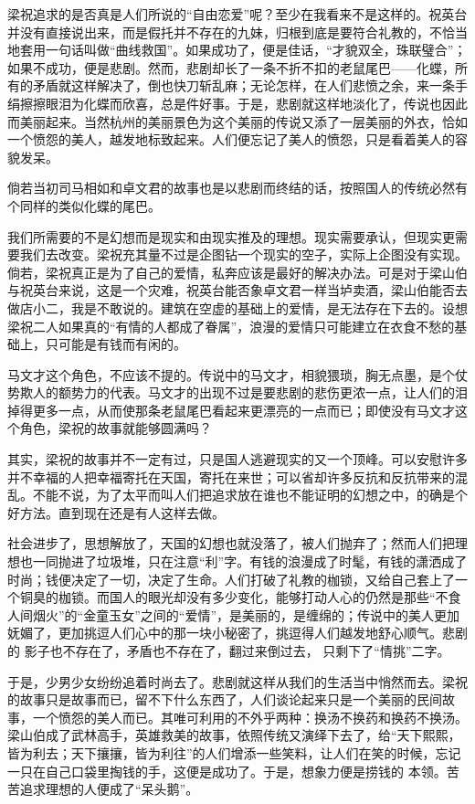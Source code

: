 梁祝追求的是否真是人们所说的“自由恋爱”呢？至少在我看来不是这样的。祝英台并没有直接说出来，而是假托并不存在的九妹，归根到底是要符合礼教的，不恰当地套用一句话叫做“曲线救国”。如果成功了，便是佳话，“才貌双全，珠联璧合”；如果不成功，便是悲剧。然而，悲剧却长了一条不折不扣的老鼠尾巴——化蝶，所有的矛盾就这样解决了，倒也快刀斩乱麻；无论怎样，在人们悲愤之余，来一条手绢擦擦眼泪为化蝶而欣喜，总是件好事。于是，悲剧就这样地淡化了，传说也因此而美丽起来。当然杭州的美丽景色为这个美丽的传说又添了一层美丽的外衣，恰如一个愤怨的美人，越发地标致起来。人们便忘记了美人的愤怨，只是看着美人的容貌发呆。

倘若当初司马相如和卓文君的故事也是以悲剧而终结的话，按照国人的传统必然有个同样的类似化蝶的尾巴。

我们所需要的不是幻想而是现实和由现实推及的理想。现实需要承认，但现实更需要我们去改变。梁祝充其量不过是企图钻一个现实的空子，实际上企图没有实现。倘若，梁祝真正是为了自己的爱情，私奔应该是最好的解决办法。可是对于梁山伯与祝英台来说，这是一个灾难，祝英台能否象卓文君一样当垆卖酒，梁山伯能否去做店小二，我是不敢说的。建筑在空虚的基础上的爱情，是无法存在下去的。设想梁祝二人如果真的“有情的人都成了眷属”，浪漫的爱情只可能建立在衣食不愁的基础上，只可能是有钱而有闲的。

马文才这个角色，不应该不提的。传说中的马文才，相貌猥琐，胸无点墨，是个仗势欺人的额势力的代表。马文才的出现不过是要悲剧的悲伤更浓一点，让人们的泪掉得更多一点，从而使那条老鼠尾巴看起来更漂亮的一点而已；即使没有马文才这个角色，梁祝的故事就能够圆满吗？

其实，梁祝的故事并不一定有过，只是国人逃避现实的又一个顶峰。可以安慰许多并不幸福的人把幸福寄托在天国，寄托在来世；可以省却许多反抗和反抗带来的混乱。不能不说，为了太平而叫人们把追求放在谁也不能证明的幻想之中，的确是个好方法。直到现在还是有人这样去做。

社会进步了，思想解放了，天国的幻想也就没落了，被人们抛弃了；然而人们把理想也一同抛进了垃圾堆，只在注意“利”字。有钱的浪漫成了时髦，有钱的潇洒成了时尚；钱便决定了一切，决定了生命。人们打破了礼教的枷锁，又给自己套上了一个铜臭的枷锁。而国人的眼光却没有多少变化，能够打动人心的仍然是那些“不食人间烟火”的“金童玉女”之间的“爱情”，是美丽的，是缠绵的；传说中的美人更加妩媚了，更加挑逗人们心中的那一块小秘密了，挑逗得人们越发地舒心顺气。悲剧的 影子也不存在了，矛盾也不存在了，翻过来倒过去， 只剩下了“情挑”二字。

于是，少男少女纷纷追着时尚去了。悲剧就这样从我们的生活当中悄然而去。梁祝的故事只是故事而已，留不下什么东西了，人们谈论起来只是一个美丽的民间故事，一个愤怨的美人而已。其唯可利用的不外乎两种：换汤不换药和换药不换汤。梁山伯成了武林高手，英雄救美的故事，依照传统又演绎下去了，给“天下熙熙，皆为利去；天下攘攘，皆为利往”的人们增添一些笑料，让人们在笑的时候，忘记一只在自己口袋里掏钱的手，这便是成功了。于是，想象力便是捞钱的 本领。苦苦追求理想的人便成了“呆头鹅”。


